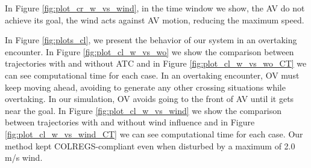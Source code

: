          
        In Figure \ref{fig:plot_cr_w_vs_wind}, in the time window we show, the \ac{AV} do not achieve its goal, the wind acts against \ac{AV} motion, reducing the maximum speed.
        
        In Figure \ref{fig:plots_cl}, we present the behavior of our system in an overtaking encounter.
        In Figure \ref{fig:plot_cl_w_vs_wo} we show the comparison between trajectories with and without \ac{ATC} and in Figure \ref{fig:plot_cl_w_vs_wo_CT} we can see computational time for each case. In an overtaking encounter, \ac{OV} must keep moving ahead, avoiding to generate any other crossing situations while overtaking. In our simulation, \ac{OV} avoids going to the front of \ac{AV} until it gets near the goal.
        In Figure \ref{fig:plot_cl_w_vs_wind} we show the comparison between trajectories with and without wind influence and in Figure \ref{fig:plot_cl_w_vs_wind_CT} we can see computational time for each case. Our method kept COLREGS-compliant even when disturbed by a maximum of 2.0 m/s wind.
